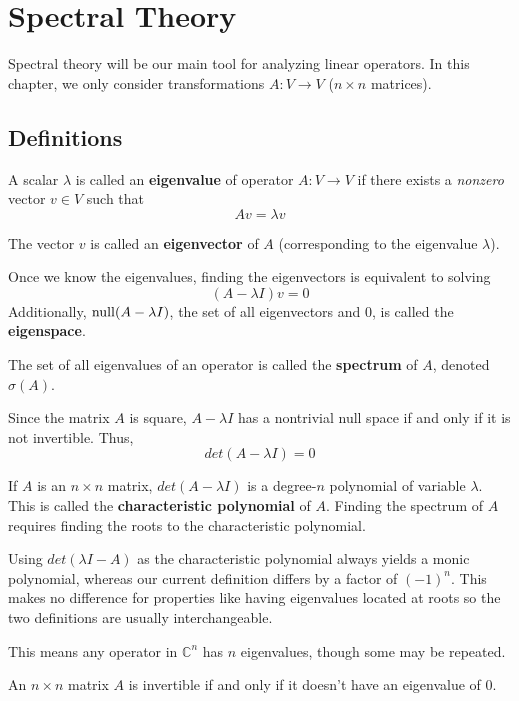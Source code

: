 \chapter{Spectral Theory}
Spectral theory will be our main tool for analyzing linear operators. In this chapter, we only consider transformations $A: V \rightarrow V$ ($n \times n$ matrices). 

\section{Definitions}

\begin{definition}
A scalar $\lambda$ is called an \textbf{eigenvalue} of operator $A: V \rightarrow V$ if there exists a \textit{nonzero} vector $v \in V$ such that 
$$Av = \lambda v$$

The vector $v$ is called an \textbf{eigenvector} of $A$ (corresponding to the eigenvalue $\lambda$).

Once we know the eigenvalues, finding the eigenvectors is equivalent to solving 
$$(A - \lambda I)v = 0$$
Additionally, $\operatorname{null}(A - \lambda I)$, the set of all eigenvectors and 0, is called the \textbf{eigenspace}. 

The set of all eigenvalues of an operator is called the \textbf{spectrum} of $A$, denoted $\sigma (A)$. 
\end{definition}

Since the matrix $A$ is square, $A - \lambda I$ has a nontrivial null space if and only if it is not invertible. Thus,
$$det(A - \lambda I) = 0$$

\begin{definition}
If $A$ is an $n \times n$ matrix, $det(A - \lambda I)$ is a degree-$n$ polynomial of variable $\lambda$. This is called the \textbf{characteristic polynomial} of $A$. Finding the spectrum of $A$ requires finding the roots to the characteristic polynomial. 

Using $det(\lambda I - A)$ as the characteristic polynomial always yields a monic polynomial, whereas our current definition differs by a factor of $(-1)^{n}$. This makes no difference for properties like having eigenvalues located at roots so the two definitions are usually interchangeable. 

This means any operator in $\mathbb{C}^{n}$ has $n$ eigenvalues, though some may be repeated. 
\end{definition}

\begin{theorem}
An $n \times n$ matrix $A$ is invertible if and only if it doesn't have an eigenvalue of 0. 
\end{theorem}

